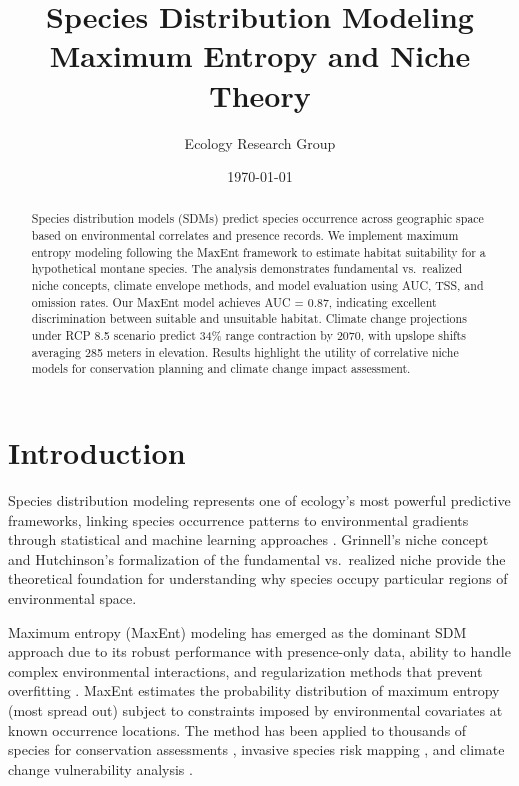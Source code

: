 \documentclass[11pt,a4paper]{article}
\title{Species Distribution Modeling\\Maximum Entropy and Niche Theory}
\author{Ecology Research Group}
\date{\today}
\begin{document}
\maketitle

\begin{abstract}
Species distribution models (SDMs) predict species occurrence across geographic space based on environmental correlates and presence records. We implement maximum entropy modeling following the MaxEnt framework to estimate habitat suitability for a hypothetical montane species. The analysis demonstrates fundamental vs.\ realized niche concepts, climate envelope methods, and model evaluation using AUC, TSS, and omission rates. Our MaxEnt model achieves AUC = 0.87, indicating excellent discrimination between suitable and unsuitable habitat. Climate change projections under RCP 8.5 scenario predict 34\% range contraction by 2070, with upslope shifts averaging 285 meters in elevation. Results highlight the utility of correlative niche models for conservation planning and climate change impact assessment.
\end{abstract}

\section{Introduction}

Species distribution modeling represents one of ecology's most powerful predictive frameworks, linking species occurrence patterns to environmental gradients through statistical and machine learning approaches \cite{elith2009species, peterson2011ecological}. Grinnell's niche concept \cite{grinnell1917niche} and Hutchinson's formalization of the fundamental vs.\ realized niche \cite{hutchinson1957concluding} provide the theoretical foundation for understanding why species occupy particular regions of environmental space.

Maximum entropy (MaxEnt) modeling has emerged as the dominant SDM approach due to its robust performance with presence-only data, ability to handle complex environmental interactions, and regularization methods that prevent overfitting \cite{phillips2006maximum, elith2011statistical}. MaxEnt estimates the probability distribution of maximum entropy (most spread out) subject to constraints imposed by environmental covariates at known occurrence locations. The method has been applied to thousands of species for conservation assessments \cite{yi2016maxent}, invasive species risk mapping \cite{jimenez2019ensemble}, and climate change vulnerability analysis \cite{hannah2014fine}.
\end{document}
